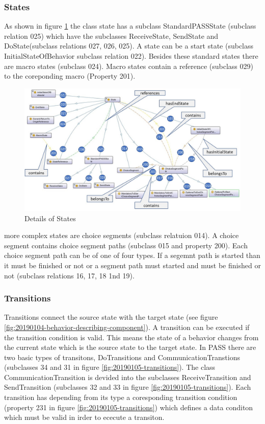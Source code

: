 \newpage
\subsubsection{States}
As shown in figure \ref{fig:20190109-states} the class state has a subclass StandardPASSState (subclass relation 025) which have the subclasses ReceiveState, SendState and DoState(subclass relations 027, 026, 025). A state can be a start state (subclass InitialStateOfBehavior subclass relation 022). Besides these standard states there are macro states (subclass 024). Macro states contain a reference (subclass 029) to the coreponding macro (Property 201).

\begin{figure}[ph]
	\centering
	\includegraphics[width=1.0\linewidth]{20181026-Ontologie-Bilder/Grafiken-Ontologie/SUbjectExecution/20190109-States}
	\caption[Details of States]{Details of States}
	\label{fig:20190109-states}
\end{figure}

more complex states are choice segments (subclass relatuion 014). A choice segment contains choice segment paths (subclass 015 and property 200). Each choice segment path can be of one of four types. If a segemnt path is started than it must be finished or not or a segment path must started and must be finished or not (subclass relations 16, 17, 18 1nd 19).


\newpage

\subsubsection{Transitions}
Transitions connect the source state with the target state (see figure \ref{fig:20190104-behavior-describing-component}). A transition can be executed if the transition condition is valid. This means the state of a behavior changes from the current state which is the source state to the target state. In PASS there are two basic types of transitons, DoTransitions and CommunicationTranstions (subclasses 34 and 31 in figure \ref{fig:20190105-transitions}). The class CommunicationTransition is devided into the subclasses ReceiveTransition and SendTransition (subclasses 32 and 33 in figure \ref{fig:20190105-transitions}). Each transition has depending from its type a coresponding transition condition (property 231 in figure  \ref{fig:20190105-transitions}) which defines a data conditon which must be valid in irder to ececute a transiton.


